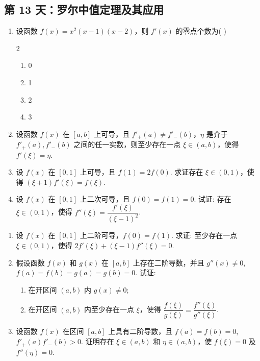 \subsection*{第 13 天：罗尔中值定理及其应用}
\vspace{1cm}

\begin{enumerate}[label=\textbf{\arabic*.}, itemsep=6cm]
    \item 设函数 $f(x) = x^2(x-1)(x-2)$，则 $f'(x)$ 的零点个数为( )
    \begin{multicols}{2}
    \begin{enumerate}
        \item 0
        \item 1
        \item 2
        \item 3
    \end{enumerate}
    \end{multicols}
    
    \item 设函数 $f(x)$ 在 $[a,b]$ 上可导，且 $f'_+(a) \ne f'_-(b)$，$\eta$ 是介于 $f'_+(a), f'_-(b)$ 之间的任一实数，则至少存在一点 $\xi \in (a,b)$，使得 $f'(\xi) = \eta$.
    
    \item 设 $f(x)$ 在 $[0,1]$ 上可导，且 $f(1) = 2f(0)$. 求证存在 $\xi \in (0,1)$，使得 $(\xi + 1)f'(\xi) = f(\xi)$.
    
    \item 设 $f(x)$ 在 $[0,1]$ 上二次可导，且 $f(0) = f(1) = 0$. 试证: 存在 $\xi \in (0,1)$，使得 $f''(\xi) = \dfrac{f'(\xi)}{(\xi - 1)^2}$.
\end{enumerate}

\newpage

\begin{enumerate}[label=\textbf{\arabic*.}, itemsep=7cm, resume]
    \item 设 $f(x)$ 在 $[0,1]$ 上二阶可导，$f(0) = f(1)$. 求证: 至少存在一点 $\xi \in (0,1)$，使得 $2f'(\xi) + (\xi - 1)f''(\xi) = 0$.
    
    \item 假设函数 $f(x)$ 和 $g(x)$ 在 $[a,b]$ 上存在二阶导数，并且 $g''(x) \ne 0$, $f(a) = f(b) = g(a) = g(b) = 0$. 试证:
    \begin{enumerate}[label=(\arabic*)]
        \item 在开区间 $(a,b)$ 内 $g(x) \ne 0$;
        \item 在开区间 $(a,b)$ 内至少存在一点 $\xi$，使得 $\dfrac{f(\xi)}{g(\xi)} = \dfrac{f''(\xi)}{g''(\xi)}$.
    \end{enumerate}
    
    \item 设函数 $f(x)$ 在区间 $[a,b]$ 上具有二阶导数，且 $f(a) = f(b) = 0$, $f'_+(a)f'_-(b) > 0$. 证明存在 $\xi \in (a,b)$ 和 $\eta \in (a,b)$，使 $f(\xi) = 0$ 及 $f''(\eta) = 0$.
    
\end{enumerate}

